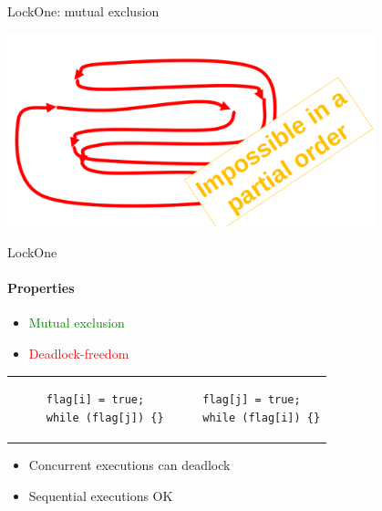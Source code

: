 \begin{frame}{LockOne: mutual exclusion}
\begin{center}
  \includegraphics[width=0.8\textwidth]{./pics/lock1/combine-7.png}
\end{center}
\end{frame}



\begin{frame}[fragile]{LockOne}
\framesubtitle{Properties}

\begin{itemize}
  \item \textcolor{green}{Mutual exclusion}
  \item \textcolor{red}{Deadlock-freedom}
\end{itemize}

\pause

\begin{tabular}{p{5cm}p{5cm}}

\begin{verbatim}
     flag[i] = true;
     while (flag[j]) {}
\end{verbatim}

 &  

\begin{verbatim}
    flag[j] = true;
    while (flag[i]) {}
\end{verbatim}

\end{tabular}

\pause

\begin{itemize}
  \item Concurrent executions can deadlock
  \item Sequential executions OK
\end{itemize}
\end{frame}


